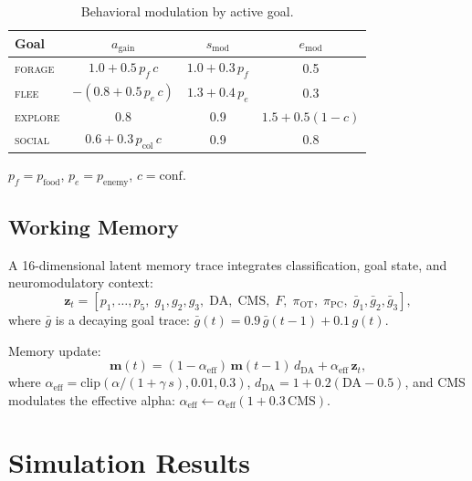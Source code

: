 \documentclass[11pt,a4paper]{article}
\begin{document}
\begin{table}[H]
\centering
\caption{Behavioral modulation by active goal.}
\label{tab:goal_behavior}
\begin{tabular}{lccc}
\toprule
Goal & $a_\text{gain}$ & $s_\text{mod}$ & $e_\text{mod}$ \\
\midrule
\textsc{forage}  & $1.0 + 0.5\,p_f\,c$ & $1.0 + 0.3\,p_f$   & 0.5 \\
\textsc{flee}    & $-(0.8 + 0.5\,p_e\,c)$ & $1.3 + 0.4\,p_e$ & 0.3 \\
\textsc{explore} & 0.8 & 0.9 & $1.5 + 0.5(1{-}c)$ \\
\textsc{social}  & $0.6 + 0.3\,p_\text{col}\,c$ & 0.9 & 0.8 \\
\bottomrule
\end{tabular}

\medskip
\small $p_f = p_\text{food}$, $p_e = p_\text{enemy}$, $c = \text{conf}$.
\end{table}

\subsection{Working Memory}

A 16-dimensional latent memory trace integrates classification, goal state,
and neuromodulatory context:
\begin{equation}\label{eq:latent}
  \mathbf{z}_t = [p_1,\ldots,p_5,\; g_1,g_2,g_3,\;
    \text{DA},\; \text{CMS},\; F,\; \pi_\text{OT},\; \pi_\text{PC},\;
    \bar{g}_1,\bar{g}_2,\bar{g}_3],
\end{equation}
where $\bar{g}$ is a decaying goal trace: $\bar{g}(t) = 0.9\,\bar{g}(t{-}1) + 0.1\,g(t)$.

Memory update:
\begin{equation}\label{eq:memory}
  \mathbf{m}(t) = (1 - \alpha_\text{eff})\,\mathbf{m}(t{-}1)\,d_\text{DA}
    + \alpha_\text{eff}\,\mathbf{z}_t,
\end{equation}
where $\alpha_\text{eff} = \text{clip}(\alpha/(1{+}\gamma\,s), 0.01, 0.3)$,
$d_\text{DA} = 1 + 0.2(\text{DA} - 0.5)$, and CMS modulates the effective
alpha: $\alpha_\text{eff} \leftarrow \alpha_\text{eff}(1 + 0.3\,\text{CMS})$.

\section{Simulation Results}\label{sec:results}
\end{document}
